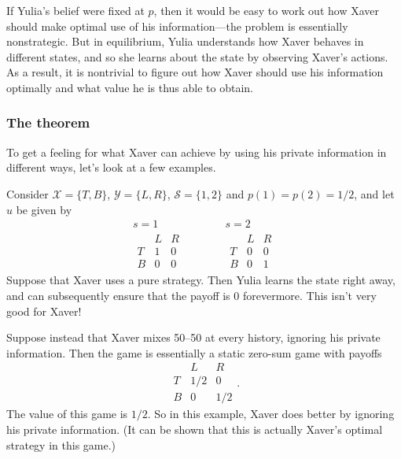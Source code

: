 \documentclass[11pt,letterpaper,reqno,oneside]{article}
\begin{document}
If Yulia's belief were fixed at $p$, then it would be easy to work out how Xaver should make optimal use of his information---the problem is essentially nonstrategic. But in equilibrium, Yulia understands how Xaver behaves in different states, and so she learns about the state by observing Xaver's actions. As a result, it is nontrivial to figure out how Xaver should use his information optimally and what value he is thus able to obtain.



\subsubsection{The theorem}
\label{sec:learning:AumannMaschler:theorem}

To get a feeling for what Xaver can achieve by using his private information in different ways, let's look at a few examples.

\begin{example}
	\label{example:AM1}
	Consider $\mathcal{X}=\{T,B\}$, $\mathcal{Y}=\{L,R\}$, $\mathcal{S}=\{1,2\}$ and $p(1)=p(2)=1/2$, and let $u$ be given by
	\begin{equation*}
		\begin{gathered}
			s=1\\
			\begin{array}{c|ccc}
				  & L & R \\ \hline
				T & 1 & 0 \\
				B & 0 & 0
			\end{array}
		\end{gathered}
		\quad\quad\quad
		\begin{gathered}
			s=2\\
			\begin{array}{c|ccc}
				  & L & R \\ \hline
				T & 0 & 0 \\
				B & 0 & 1
			\end{array} 
		\end{gathered}
	\end{equation*}
	Suppose that Xaver uses a pure strategy. Then Yulia learns the state right away, and can subsequently ensure that the payoff is 0 forevermore. This isn't very good for Xaver!

	Suppose instead that Xaver mixes 50--50 at every history, ignoring his private information. Then the game is essentially a static zero-sum game with payoffs
	\begin{equation*}
		\begin{array}{c|ccc}
			  & L & R \\ \hline
			T & 1/2 & 0 \\
			B & 0 & 1/2
		\end{array} .
	\end{equation*}
	The value of this game is $1/2$. So in this example, Xaver does better by ignoring his private information. (It can be shown that this is actually Xaver's optimal strategy in this game.)
\end{example}
\end{document}
